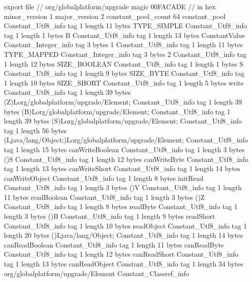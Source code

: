 export file {		// org/globalplatform/upgrade
	magic	00FACADE		 // in hex
	minor_version	1
	major_version	2
	constant_pool_count	64
	constant_pool {
		Constant_Utf8_info {
			tag	1
			length	11
			bytes	TYPE_SIMPLE
		}
		Constant_Utf8_info {
			tag	1
			length	1
			bytes	B
		}
		Constant_Utf8_info {
			tag	1
			length	13
			bytes	ConstantValue
		}
		Constant_Integer_info {
			tag	3
			bytes	1
		}
		Constant_Utf8_info {
			tag	1
			length	11
			bytes	TYPE_MAPPED
		}
		Constant_Integer_info {
			tag	3
			bytes	2
		}
		Constant_Utf8_info {
			tag	1
			length	12
			bytes	SIZE_BOOLEAN
		}
		Constant_Utf8_info {
			tag	1
			length	1
			bytes	S
		}
		Constant_Utf8_info {
			tag	1
			length	9
			bytes	SIZE_BYTE
		}
		Constant_Utf8_info {
			tag	1
			length	10
			bytes	SIZE_SHORT
		}
		Constant_Utf8_info {
			tag	1
			length	5
			bytes	write
		}
		Constant_Utf8_info {
			tag	1
			length	39
			bytes	(Z)Lorg/globalplatform/upgrade/Element;
		}
		Constant_Utf8_info {
			tag	1
			length	39
			bytes	(B)Lorg/globalplatform/upgrade/Element;
		}
		Constant_Utf8_info {
			tag	1
			length	39
			bytes	(S)Lorg/globalplatform/upgrade/Element;
		}
		Constant_Utf8_info {
			tag	1
			length	56
			bytes	(Ljava/lang/Object;)Lorg/globalplatform/upgrade/Element;
		}
		Constant_Utf8_info {
			tag	1
			length	15
			bytes	canWriteBoolean
		}
		Constant_Utf8_info {
			tag	1
			length	3
			bytes	()S
		}
		Constant_Utf8_info {
			tag	1
			length	12
			bytes	canWriteByte
		}
		Constant_Utf8_info {
			tag	1
			length	13
			bytes	canWriteShort
		}
		Constant_Utf8_info {
			tag	1
			length	14
			bytes	canWriteObject
		}
		Constant_Utf8_info {
			tag	1
			length	8
			bytes	initRead
		}
		Constant_Utf8_info {
			tag	1
			length	3
			bytes	()V
		}
		Constant_Utf8_info {
			tag	1
			length	11
			bytes	readBoolean
		}
		Constant_Utf8_info {
			tag	1
			length	3
			bytes	()Z
		}
		Constant_Utf8_info {
			tag	1
			length	8
			bytes	readByte
		}
		Constant_Utf8_info {
			tag	1
			length	3
			bytes	()B
		}
		Constant_Utf8_info {
			tag	1
			length	9
			bytes	readShort
		}
		Constant_Utf8_info {
			tag	1
			length	10
			bytes	readObject
		}
		Constant_Utf8_info {
			tag	1
			length	20
			bytes	()Ljava/lang/Object;
		}
		Constant_Utf8_info {
			tag	1
			length	14
			bytes	canReadBoolean
		}
		Constant_Utf8_info {
			tag	1
			length	11
			bytes	canReadByte
		}
		Constant_Utf8_info {
			tag	1
			length	12
			bytes	canReadShort
		}
		Constant_Utf8_info {
			tag	1
			length	13
			bytes	canReadObject
		}
		Constant_Utf8_info {
			tag	1
			length	34
			bytes	org/globalplatform/upgrade/Element
		}
		Constant_Classref_info {
}}}
